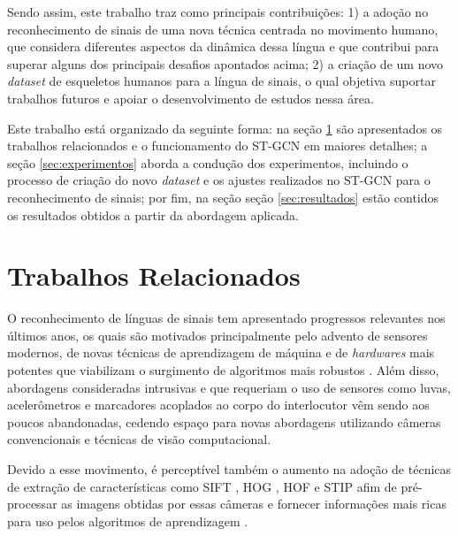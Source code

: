 Sendo assim, este trabalho traz como principais contribuições: 1) a adoção no reconhecimento de sinais de uma nova técnica centrada no movimento humano, que considera diferentes aspectos da dinâmica dessa língua e que contribui para superar alguns dos principais desafios apontados acima; 2) a criação de um novo \textit{dataset} de esqueletos humanos para a língua de sinais, o qual objetiva suportar trabalhos futuros e apoiar o desenvolvimento de estudos nessa área.

Este trabalho está organizado da seguinte forma: na seção \ref{sec:trabalhos-relacionados} são apresentados os trabalhos relacionados e o funcionamento do ST-GCN em maiores detalhes; a seção \ref{sec:experimentos} aborda a condução dos experimentos, incluindo o processo de criação do novo \textit{dataset} e os ajustes realizados no ST-GCN para o reconhecimento de sinais; por fim, na seção seção \ref{sec:resultados} estão contidos os resultados obtidos a partir da abordagem aplicada.



\section{Trabalhos Relacionados} %
\label{sec:trabalhos-relacionados}

O reconhecimento de línguas de sinais tem apresentado progressos relevantes nos últimos anos, os quais são motivados principalmente pelo advento de sensores modernos, de novas técnicas de aprendizagem de máquina e de \textit{hardwares} mais potentes que viabilizam o surgimento de algoritmos mais robustos \cite{recent-advances-dl-2017, recent-advances-sl-2013}. Além disso, abordagens consideradas intrusivas e que requeriam o uso de sensores como luvas, acelerômetros e marcadores acoplados ao corpo do interlocutor vêm sendo aos poucos abandonadas, cedendo espaço para novas abordagens utilizando câmeras convencionais e técnicas de visão computacional. 

Devido a esse movimento, é perceptível também o aumento na adoção de técnicas de extração de características como SIFT \cite{lowe-2004}, HOG \cite{dalal-2005}, HOF \cite{laptev-2008} e STIP \cite{laptev-2008} \cite{recent-advances-dl-2017} afim de pré-processar as imagens obtidas por essas câmeras e fornecer informações mais ricas para uso pelos algoritmos de aprendizagem \cite{lim-2016, shanta-2018}.


